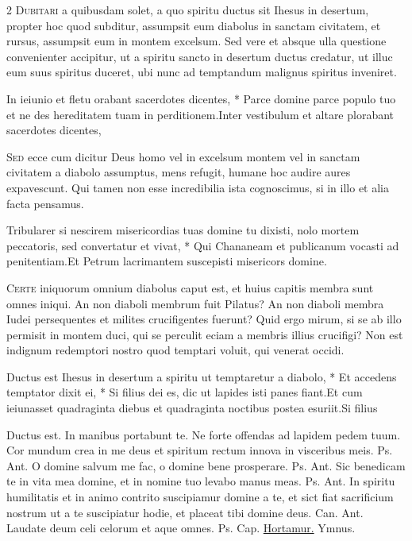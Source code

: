 \begin{multicols*}{2}
\lettrine[lines=2]{\zallmancaps \color{Blue} D}{ubitari} a quibusdam solet, a quo spiritu ductus sit Ihesus in desertum, propter hoc quod subditur, assumpsit eum diabolus in sanctam civitatem, et rursus, assumpsit eum in montem excelsum. Sed vere et absque ulla questione convenienter accipitur, ut a spiritu sancto in desertum ductus credatur, ut illuc eum suus spiritus duceret, ubi nunc ad temptandum malignus spiritus inveniret.
\begin{responsory}[in-ieiunio]
{In ieiunio et fletu orabant sacerdotes dicentes, * Parce domine parce populo tuo et ne des hereditatem tuam in perditionem.}{Inter vestibulum et altare plorabant sacerdotes dicentes,}
\end{responsory}%
\lettrine[lines=2]{\zallmancaps \color{Red} S}{ed} ecce cum dicitur Deus homo vel in excelsum montem vel in sanctam civitatem a diabolo assumptus, mens refugit, humane hoc audire aures expavescunt. Qui tamen non esse incredibilia ista cognoscimus, si in illo et alia facta pensamus.
\begin{responsory}[tribularer-si]
{Tribularer si nescirem misericordias tuas domine tu dixisti, nolo mortem peccatoris, sed convertatur et vivat, * Qui Chananeam et publicanum vocasti ad penitentiam.}{Et Petrum lacrimantem suscepisti misericors domine.}
\end{responsory}%
\lettrine[lines=2]{\zallmancaps \color{Blue} C}{erte} iniquorum omnium diabolus caput est, et huius capitis membra sunt omnes iniqui. An non diaboli membrum fuit Pilatus? An non diaboli membra Iudei persequentes et milites crucifigentes fuerunt? Quid ergo mirum, si se ab illo permisit in montem duci, qui se perculit eciam a membris illius crucifigi? Non est indignum redemptori nostro quod temptari voluit, qui venerat occidi.
\begin{responsory-final}
{Ductus est Ihesus in desertum a spiritu ut temptaretur a diabolo, * Et accedens temptator dixit ei, * Si filius dei es, dic ut lapides isti panes fiant.}{Et cum ieiunasset quadraginta diebus et quadraginta noctibus postea esuriit.}{Si filius}
\end{responsory-final}%
{Ductus est.} \V In manibus portabunt te. \R Ne forte offendas ad lapidem pedem tuum.
 Cor mundum crea in me deus et spiritum rectum innova in visceribus meis. {\color{Red} Ps.}  {\color{Red} Ant.} O domine salvum me fac, o domine bene prosperare. {\color{Red} Ps.}  {\color{Red} Ant.} Sic benedicam te in vita mea domine, et in nomine tuo levabo manus meas. {\color{Red} Ps.}  {\color{Red} Ant.} In spiritu humilitatis et in animo contrito suscipiamur domine a te, et sict fiat sacrificium nostrum ut a te suscipiatur hodie, et placeat tibi domine deus. {\color{Red} Can.}  {\color{Red} Ant.} Laudate deum celi celorum et aque omnes. {\color{Red} Ps.}  {\color{Red} Cap.} \hyperlink{hortamur-vos}{Hortamur.} {\color{Red} Ymnus.}

\end{multicols*}
